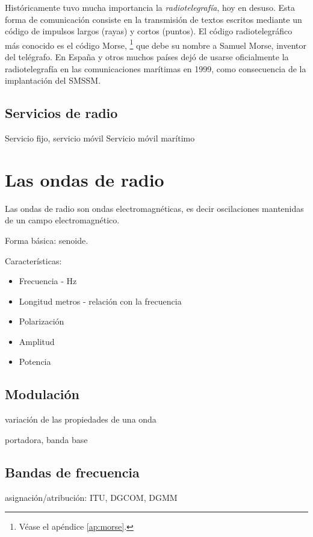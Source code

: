 Históricamente tuvo mucha importancia la \emph{radiotelegrafía}, hoy en desuso. Esta forma de comunicación consiste en la transmisión de textos escritos mediante un código de impulsos largos (rayas) y cortos (puntos). El código radiotelegráfico más conocido es el código Morse,%
\footnote{Véase el apéndice \ref{ap:morse}.}
que debe su nombre a Samuel Morse, inventor del telégrafo. En España y otros muchos países dejó de usarse oficialmente la radiotelegrafía en las comunicaciones marítimas en 1999, como consecuencia de la implantación del SMSSM.

\subsection{Servicios de radio}

Servicio fijo, servicio móvil
Servicio móvil marítimo

\section{Las ondas de radio}

Las ondas de radio son ondas electromagnéticas, es decir oscilaciones mantenidas de un campo electromagnético.

Forma básica: senoide.

Características:

\begin{itemize}
\item Frecuencia - Hz
\item Longitud metros - relación con la frecuencia
\item Polarización
\item Amplitud
\item Potencia
\end{itemize}

\subsection{Modulación}

variación de las propiedades de una onda

portadora, banda base

\subsection{Bandas de frecuencia}

asignación/atribución: ITU, DGCOM, DGMM


